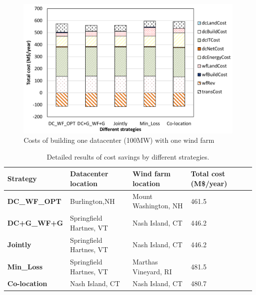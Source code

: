 \begin{figure}[ht]
\centering
\includegraphics[width=1\columnwidth]{img/cost-one-dc-one-wf}
\caption{Costs of building one datacenter (100MW) with one wind farm}
\label{fig:cost1dc1wf}
\end{figure}

\begin{table}[ht]
\begin{center}
\caption{Detailed results of cost savings by different strategies.}
\begin{tabular}{|l|p{50pt}|p{50pt}|p{30pt}|p{20pt}|}
\hline
\textbf{Strategy}& \textbf{Datacenter location} &\textbf{Wind farm location} &\textbf{Total cost (M\$/year)}%
 \\
\hline
\textbf{DC\_WF\_OPT} &  Burlington,NH  & Mount Washington, NH & 461.5%
\\
\textbf{DC+G\_WF+G} &Springfield Hartnes, VT  & Nash Island, CT& 446.2%
\\
\textbf{Jointly} &Springfield Hartnes, VT&  Nash Island, CT & 446.2%
\\
\textbf{Min\_Loss} &Springfield Hartnes, VT & Marthas Vineyard, RI & 481.5%
\\
\textbf{Co-location}& Nash Island, CT &Nash Island, CT& 480.7%
\\
\hline
\end{tabular}
\label{tab:costsaving}
\end{center}
\end{table}

